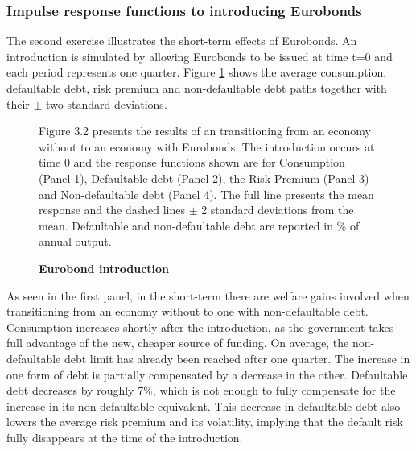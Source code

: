 \subsubsection{Impulse response functions to introducing Eurobonds}
The second exercise illustrates the short-term effects of Eurobonds. An introduction is simulated by allowing Eurobonds to be issued at time t=0 and each period represents one quarter. Figure \ref{fig:intro} shows the average consumption, defaultable debt, risk premium and non-defaultable debt paths together with their $\pm$ two standard deviations.\\
 \begin{figure}[H] 
     \centering
     \caption{\textbf{Eurobond introduction}}
     \vspace{1mm}
      \label{fig:intro}
      \begin{tablenotes}
      \footnotesize
      \item Figure 3.2 presents the results of an transitioning from an economy without to an economy with Eurobonds. The introduction occurs at time 0 and the response functions shown are for Consumption (Panel 1), Defaultable debt (Panel 2), the Risk Premium (Panel 3) and Non-defaultable debt (Panel 4). The full line presents the mean response and the dashed lines $\pm$ 2 standard deviations from the mean. Defaultable and non-defaultable debt are reported in \% of annual output.
      \end{tablenotes}
 \end{figure}


As seen in the first panel, in the short-term there are welfare gains involved when transitioning from an economy without to one with non-defaultable debt. Consumption increases shortly after the introduction, as the government takes full advantage of the new, cheaper source of funding. On average, the non-defaultable debt limit has already been reached after one quarter. The increase in one form of debt is partially compensated by a decrease in the other. Defaultable debt decreases by roughly 7\%, which is not enough to fully compensate for the increase in its non-defaultable equivalent. This decrease in defaultable debt also lowers the average risk premium and its volatility, implying that the default risk fully disappears at the time of the introduction.\\  

